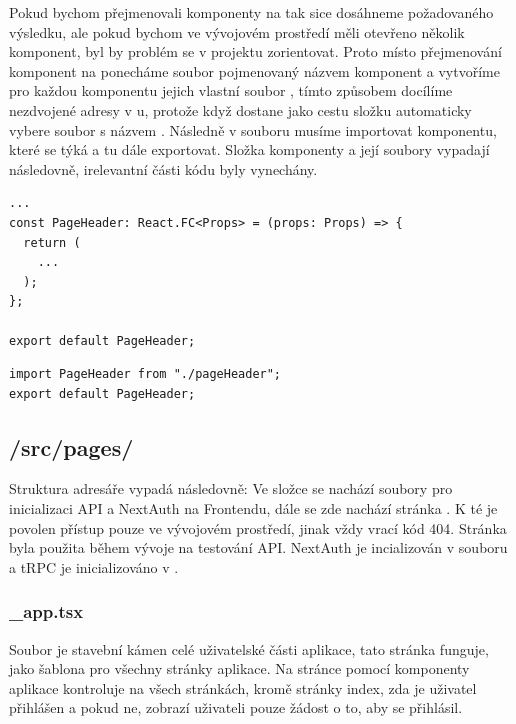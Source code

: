 Pokud bychom přejmenovali komponenty na  tak sice dosáhneme požadovaného výsledku, ale pokud bychom ve vývojovém prostředí měli otevřeno několik komponent, byl by problém se v projektu zorientovat.
Proto místo přejmenování komponent na  ponecháme soubor pojmenovaný názvem komponent a vytvoříme pro každou komponentu jejich vlastní soubor , tímto způsobem docílíme nezdvojené adresy v u, protože když  dostane jako cestu složku automaticky vybere soubor s názvem . Následně v souboru  musíme importovat komponentu, které se týká a tu dále exportovat. Složka komponenty a její soubory vypadají následovně, irelevantní části kódu byly vynechány.
\begin{lstlisting}[caption=Deklarace komponenty pageHeader]
...
const PageHeader: React.FC<Props> = (props: Props) => {
  return (
    ...
  );
};

export default PageHeader;
\end{lstlisting}
\begin{lstlisting}[caption=Soubor index.tsx komponenty pageHeader]
import PageHeader from "./pageHeader";
export default PageHeader;
\end{lstlisting}
\subsection{/src/pages/}
Struktura adresáře  vypadá následovně:
\hfill \break
Ve složce  se nachází soubory pro inicializaci API a NextAuth na Frontendu, dále se zde nachází stránka . K té je povolen přístup pouze ve vývojovém prostředí, jinak vždy vrací kód 404. Stránka byla použita během vývoje na testování API. NextAuth je incializován v souboru  a tRPC je inicializováno v .

\subsubsection{\_app.tsx}
Soubor  je stavební kámen celé uživatelské části aplikace, tato stránka funguje, jako šablona pro všechny stránky aplikace. Na stránce pomocí komponenty  aplikace kontroluje na všech stránkách, kromě stránky index, zda je uživatel přihlášen a pokud ne, zobrazí uživateli pouze žádost o to, aby se přihlásil.

